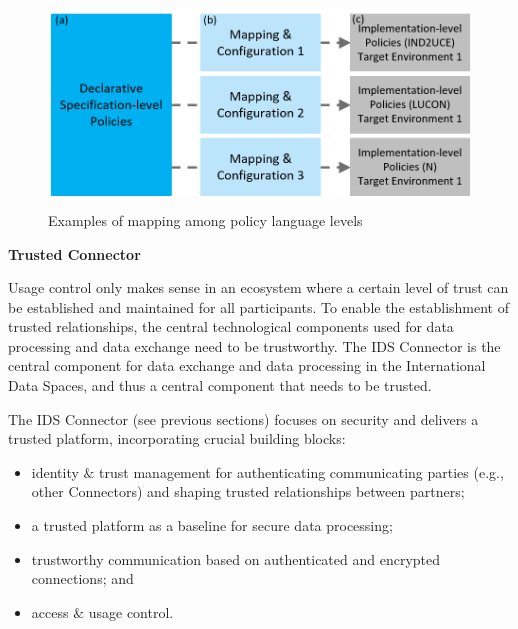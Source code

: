 
\begin{figure}[H]
	\begin{Center}
		\includegraphics[width=4.94in,height=2.17in]{./media/image73.png}
		\caption{Examples of mapping among policy language levels}
		\label{fig:Examples_of_mapping_among_policy_language_levels}
	\end{Center}
\end{figure}



\textbf{Trusted Connector\\}

Usage control only makes sense in an ecosystem where a certain level of trust can be established and maintained for all participants. To enable the establishment of trusted relationships, the central technological components used for data processing and data exchange need to be trustworthy. The IDS Connector is the central component for data exchange and data processing in the International  Data Spaces, and thus a central component that needs to be trusted.

The IDS Connector (see previous sections) focuses on security and delivers a trusted platform, incorporating crucial building blocks:

\begin{itemize}
	\item identity $\&$  trust management for authenticating communicating parties (e.g., other Connectors) and shaping trusted relationships between partners;

	\item a trusted platform as a baseline for secure data processing;

	\item trustworthy communication based on authenticated and encrypted connections; and

	\item access $\&$  usage control.
\end{itemize}


